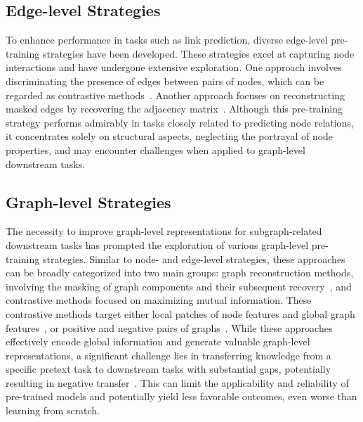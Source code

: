 \subsection{Edge-level Strategies}\label{subsec:edge_pre}
To enhance performance in tasks such as link prediction, diverse edge-level pre-training strategies have been developed. These strategies excel at capturing node interactions and have undergone extensive exploration. One approach involves discriminating the presence of edges between pairs of nodes, which can be regarded as contrastive methods~\cite{jin2021node, long2022pretraining}. Another approach focuses on reconstructing masked edges by recovering the adjacency matrix~\cite{tan2023s2gae, li2023what, pan2018adversarially, hasanzadeh2019semiimplicit, kim2021how}. Although this pre-training strategy performs admirably in tasks closely related to predicting node relations, it concentrates solely on structural aspects, neglecting the portrayal of node properties, and may encounter challenges when applied to graph-level downstream tasks.




\subsection{Graph-level Strategies}\label{subsec:graph_pre}
The necessity to improve graph-level representations for subgraph-related downstream tasks has prompted the exploration of various graph-level pre-training strategies. Similar to node- and edge-level strategies, these approaches can be broadly categorized into two main groups: graph reconstruction methods, involving the masking of graph components and their subsequent recovery~\cite{xie2022selfsupervised, rong2020selfsupervised}, and contrastive methods focused on maximizing mutual information. These contrastive methods target either local patches of node features and global graph features~\cite{velickovic2019deep, sun2020infograph, hassani2020contrastive, sun2021mocl, subramonian2021motifdriven}, or positive and negative pairs of graphs~\cite{you2020graph, suresh2021adversarial, thakoor2021bootstrapped,qiu2020gcc}. While these approaches effectively encode global information and generate valuable graph-level representations, a significant challenge lies in transferring knowledge from a specific pretext task to downstream tasks with substantial gaps, potentially resulting in negative transfer~\cite{rosenstein2005transfer}. This can limit the applicability and reliability of pre-trained models and potentially yield less favorable outcomes, even worse than learning from scratch.


